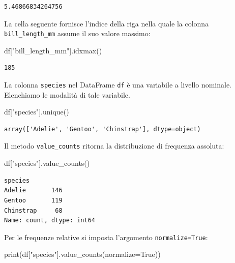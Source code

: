 \documentclass[
  letterpaper,
  krantz2]{{[}./krantz{]}}
\newenvironment{Shaded}{\begin{snugshade}}{\end{snugshade}}
\newcommand{\BuiltInTok}[1]{\textcolor[rgb]{0.00,0.23,0.31}{#1}}
\newcommand{\NormalTok}[1]{\textcolor[rgb]{0.00,0.23,0.31}{#1}}
\newcommand{\OperatorTok}[1]{\textcolor[rgb]{0.37,0.37,0.37}{#1}}
\newcommand{\StringTok}[1]{\textcolor[rgb]{0.13,0.47,0.30}{#1}}
\newcommand{\VariableTok}[1]{\textcolor[rgb]{0.07,0.07,0.07}{#1}}
\begin{document}
\begin{verbatim}
5.46866834264756
\end{verbatim}

La cella seguente fornisce l'indice della riga nella quale la colonna
\texttt{bill\_length\_mm} assume il suo valore massimo:

\begin{Shaded}
\begin{Highlighting}[]
\NormalTok{df[}\StringTok{"bill\_length\_mm"}\NormalTok{].idxmax()}
\end{Highlighting}
\end{Shaded}

\begin{verbatim}
185
\end{verbatim}

La colonna \texttt{species} nel DataFrame \texttt{df} è una variabile a
livello nominale. Elenchiamo le modalità di tale variabile.

\begin{Shaded}
\begin{Highlighting}[]
\NormalTok{df[}\StringTok{"species"}\NormalTok{].unique()}
\end{Highlighting}
\end{Shaded}

\begin{verbatim}
array(['Adelie', 'Gentoo', 'Chinstrap'], dtype=object)
\end{verbatim}

Il metodo \texttt{value\_counts} ritorna la distribuzione di frequenza
assoluta:

\begin{Shaded}
\begin{Highlighting}[]
\NormalTok{df[}\StringTok{"species"}\NormalTok{].value\_counts()}
\end{Highlighting}
\end{Shaded}

\begin{verbatim}
species
Adelie       146
Gentoo       119
Chinstrap     68
Name: count, dtype: int64
\end{verbatim}

Per le frequenze relative si imposta l'argomento
\texttt{normalize=True}:

\begin{Shaded}
\begin{Highlighting}[]
\BuiltInTok{print}\NormalTok{(df[}\StringTok{"species"}\NormalTok{].value\_counts(normalize}\OperatorTok{=}\VariableTok{True}\NormalTok{))}
\end{Highlighting}
\end{Shaded}
\end{document}
